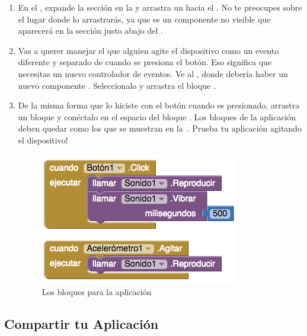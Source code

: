 \documentclass[letterpaper]{article}
\begin{document}
\begin{enumerate}

\item En el \designer, expande la sección \sensors en la \palette y
  arrastra un  hacia el \viewer. No te
  preocupes sobre el lugar donde lo arrastrarás, ya que es un
  componente no visible que aparecerá en la sección justo abajo del
  \viewer.

\item Vas a querer manejar el que alguien agite el dispositivo como un
  evento diferente y separado de cuando se presiona el botón. Eso
  significa que necesitas un nuevo controlador de eventos. Ve al
  \blockEditor, donde debería haber un nuevo componente
  . Seleccionalo y arrastra el bloque
  .

\item De la misma forma que lo hiciste con el botón cuando es
  presionado, arrastra un bloque  y
  conéctalo en el espacio del bloque . Los
  bloques de la aplicación deben quedar como los que se muestran en
  la~. Prueba tu aplicación agitando el
  dispositivo!

\begin{figure}[H]
\centering
\includegraphics[scale=0.25]{figures/HolaGatitoBlocks}
\caption{Los bloques para la aplicación }
\label{fig:holaGatitoBlocks}
\end{figure}

\end{enumerate}

\subsection*{Compartir tu Aplicación}
\end{document}
